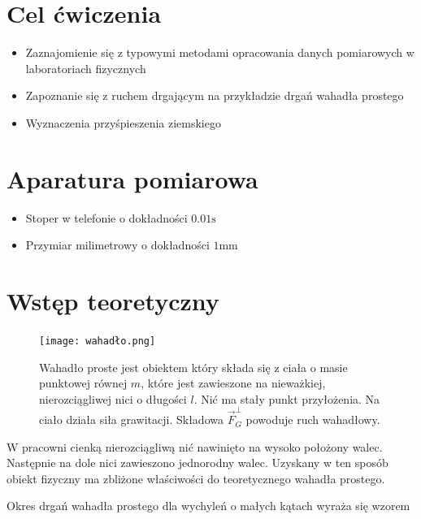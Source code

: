 \documentclass{fizykalab}
\begin{document}
\newcommand{\mss}{\ensuremath{\frac{\text{m}}{\text{s}^2}}}


\maketitle

\section{Cel ćwiczenia}
\begin{itemize}
    \item Zaznajomienie się z typowymi metodami opracowania danych pomiarowych w laboratoriach fizycznych 
    \item Zapoznanie się z ruchem drgającym na przykładzie drgań wahadła prostego
    \item Wyznaczenia przyśpieszenia ziemskiego
\end{itemize}


\section{Aparatura pomiarowa}
\begin{itemize}
    \item Stoper w telefonie o dokładności $0.01\text{s}$
    \item Przymiar milimetrowy o dokładności $1\text{mm}$
\end{itemize}


\section{Wstęp teoretyczny}
\begin{figure}[H]
    \centering
    \texttt{[image: wahadło.png]}
    \caption{\cite{Wahadło} Wahadło proste jest obiektem który składa się z ciała o masie punktowej równej $m$,
             które jest zawieszone na nieważkiej, nierozciągliwej nici o długości $l$.
             Nić ma stały punkt przyłożenia. Na ciało działa siła grawitacji.
             Składowa $\vec{F}^{\bot}_G$ powoduje ruch wahadłowy.
             }
    \label{fig:enter-label}
\end{figure}

W pracowni cienką nierozciągliwą nić nawinięto na wysoko położony walec. Następnie na dole nici zawieszono 
jednorodny walec. Uzyskany w ten sposób obiekt fizyczny ma zbliżone właściwości do teoretycznego wahadła prostego.

Okres drgań wahadła prostego dla wychyleń o małych kątach wyraża się wzorem
\end{document}
